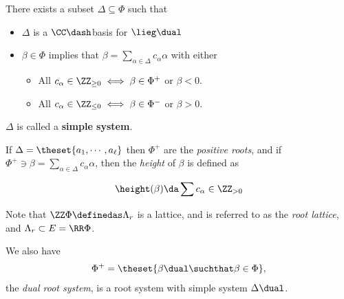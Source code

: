 \begin{definition}

There exists a subset \(\Delta \subseteq \Phi\) such that

\begin{itemize}
\tightlist
\item
  \(\Delta\) is a \(\CC\dash\)basis for \(\lieg\dual\)
\item
  \(\beta\in\Phi\) implies that
  \(\beta = \sum_{\alpha \in \Delta} c_\alpha \alpha\) with either

  \begin{itemize}
  \tightlist
  \item
    All \(c_\alpha \in \ZZ_{\geq 0} \iff \beta \in \Phi^+\) or
    \(\beta < 0\).
  \item
    All \(c_\alpha \in \ZZ_{\leq 0} \iff \beta \in \Phi^-\) or
    \(\beta > 0\).
  \end{itemize}
\end{itemize}

\(\Delta\) is called a \textbf{simple system}.

\end{definition}

\begin{definition}

If \(\Delta = \theset{a_1, \cdots, a_\ell}\) then \(\Phi^+\) are the
\emph{positive roots}, and if
\(\Phi^+ \ni \beta = \sum_{\alpha \in \Delta} c_\alpha \alpha\), then
the \emph{height} of \(\beta\) is defined as

\begin{align*}
\height(\beta) \da 
\sum c_\alpha \in \ZZ_{> 0}
\end{align*}

\end{definition}

\begin{definition}

Note that \(\ZZ \Phi \definedas \Lambda_r\) is a lattice, and is
referred to as the \emph{root lattice}, and
\(\Lambda_r \subset E = \RR \Phi\).

We also have
\begin{align*}
\Phi^+ = \theset{\beta\dual \suchthat \beta \in \Phi}
,\end{align*} the \emph{dual root system}, is a root system with simple
system \(\Delta\dual\).

\end{definition}

